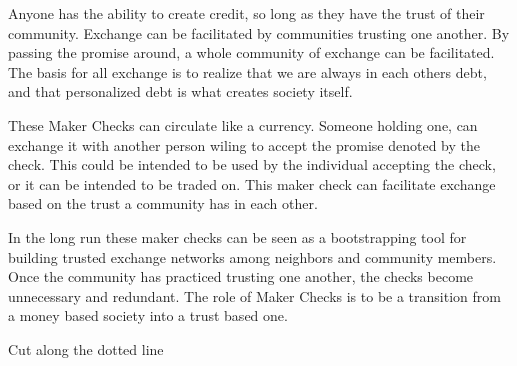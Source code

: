 \begin{minipage}[t]{2.7in}
	Anyone has the ability to create credit, so long as they have the trust of their community. Exchange can be facilitated by communities trusting one another. By passing the promise around, a whole community of exchange can be facilitated. The  basis for all exchange is to realize that we are always in each others debt, and that personalized debt is what creates society itself. 
	
	\vspace{0.2cm}
	
	These Maker Checks can circulate like a currency. Someone holding one, can exchange it with another person wiling to accept the promise denoted by the check. This could be intended to be used by the individual accepting the check, or it can be intended to be traded on. This maker check can facilitate exchange based on the trust a community has in each other. 
	
	 \vspace{0.2cm}
	 
	 In the long run these maker checks can be seen as a bootstrapping tool for building trusted exchange networks among neighbors and community members. Once the community has practiced trusting one another, the checks become unnecessary and redundant. The role of Maker Checks is to be a transition from a money based society into a trust based one. 
	
	
\end{minipage}%
\vspace{0.2cm}
\begin{minipage}[t]{2.3in}
	\vspace{0pt}
	\centering
	
	\makercheck
	
	\vspace{0.1cm}
	{\footnotesize Cut along the dotted line}
\end{minipage}
